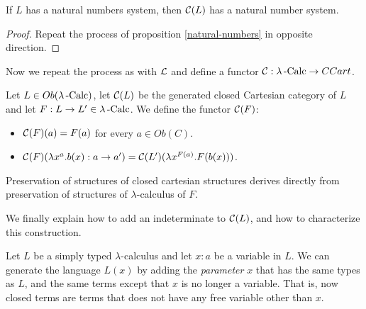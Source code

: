 \begin{proposition}
  If $L$ has a natural numbers system, then $\mathcal{C} (L)$ has a natural number system.
\end{proposition}
\begin{proof}
  Repeat the process of proposition \ref{natural-numbers} in opposite direction.
\end{proof}
Now we repeat the process as with $\mathcal{L}$ and define a functor $\mathcal{C}: \lambda\operatorname{-Calc} \to CCart$.
\begin{definition}
  Let $L\in Ob(\lambda\operatorname{-Calc})$, let $\mathcal{C} (L)$ be the generated closed Cartesian category of $L$ and let $F:L\to L'\in \lambda\operatorname{-Calc}$.  We define the functor $\mathcal{C} (F)$:
  \begin{itemize}
  \item $\mathcal{C} (F) (a) = F(a)$ for every $a\in Ob(C)$.
  \item $\mathcal{C} (F) (\lambda x^a. b(x) :a \to a') = \mathcal{C} (L') (\lambda x^{F(a)}. F(b(x)))$.
  \end{itemize}
\end{definition}
\begin{remark}
  Preservation of structures of closed cartesian structures derives directly from preservation of structures of $\lambda$-calculus of $F$.
\end{remark}

We finally explain how to add an indeterminate to $\mathcal{C}(L)$, and how to characterize this construction.

\begin{definition}
  Let $L$ be a simply typed $\lambda$-calculus and let $x : a$ be a variable in $L$. We can generate the language $L(x)$ by adding the \emph{parameter} $x$ that has the same types as $L$, and the same terms except that $x$ is no longer a variable. That is, now closed terms are terms that does not have any free variable other than $x$.
\end{definition}




